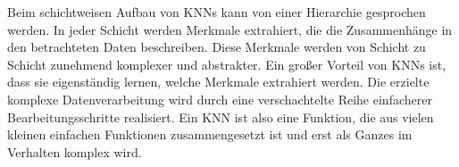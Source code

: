 %
%
%

Beim schichtweisen Aufbau von KNNs kann von einer Hierarchie gesprochen werden. In jeder Schicht werden Merkmale extrahiert, die die Zusammenhänge in den be\-trach\-te\-ten Daten beschreiben. Diese Merkmale werden von Schicht zu Schicht zunehmend komplexer und abstrakter. Ein großer Vorteil von KNNs ist, dass sie eigenständig lernen, welche Merkmale extrahiert werden. Die erzielte komplexe Datenverarbeitung wird  durch eine verschachtelte Reihe einfacherer Bearbeitungsschritte realisiert. Ein KNN ist also eine Funktion, die aus vielen kleinen einfachen Funktionen zusammengesetzt ist und erst als Ganzes im Verhalten komplex wird. 


